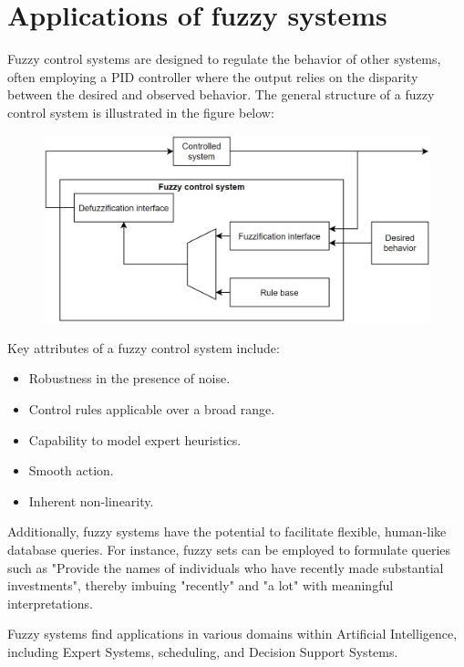\section{Applications of fuzzy systems}

Fuzzy control systems are designed to regulate the behavior of other systems, often employing a PID controller where the output relies on the disparity between the desired and observed behavior. 
The general structure of a fuzzy control system is illustrated in the figure below:
\begin{figure}[H]
    \centering
    \includegraphics[width=0.75\linewidth]{images/control.png}
\end{figure}
Key attributes of a fuzzy control system include:
\begin{itemize}
    \item Robustness in the presence of noise.
    \item Control rules applicable over a broad range.
    \item Capability to model expert heuristics.
    \item Smooth action.
    \item Inherent non-linearity.
\end{itemize}
Additionally, fuzzy systems have the potential to facilitate flexible, human-like database queries. 
For instance, fuzzy sets can be employed to formulate queries such as "Provide the names of individuals who have recently made substantial investments", thereby imbuing "recently" and "a lot" with meaningful interpretations.

Fuzzy systems find applications in various domains within Artificial Intelligence, including Expert Systems, scheduling, and Decision Support Systems.